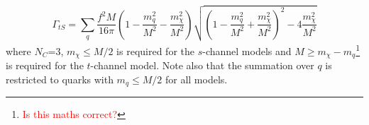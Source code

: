 \begin{flushleft}
\begin{equation}
\end{equation}
\begin{equation}
\label{gamma_tS}
\Gamma_{tS} = \sum_{\substack{q}} \frac{f^{2}M}{16\pi}\left(1 - \frac{m_{q}^{2}}{M^{2}} - \frac{m_{\chi}^{2}}{M^{2}}\right)\sqrt{\left(1 - \frac{m_{q}^{2}}{M^{2}} + \frac{m_{\chi}^{2}}{M^{2}}\right)^{2} - 4\frac{m_{\chi}^{2}}{M^{2}}}
\end{equation}
where $N_{C}$=3, $m_{\chi} \leq M/2$ is required for the $s$-channel models and $M \geq m_{\chi} - m_{q}$\footnote{\textcolor{red}{Is this maths correct?}} is required for the $t$-channel model. Note also that the summation over $q$ is restricted to quarks with $m_{q} \leq M/2$ for all models.

\end{flushleft}


